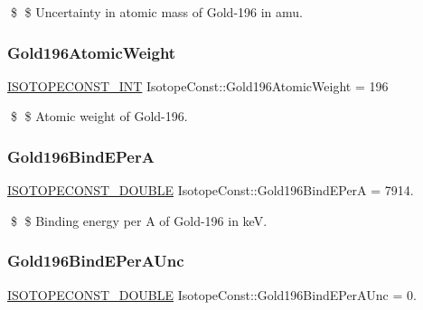\$ \$ Uncertainty in atomic mass of Gold-\/196 in amu. \mbox{\label{group___isotope_const-_gold-_au196_ga96871e34b914e66d1fdf90c41ed42cc0}} 
\subsubsection{\texorpdfstring{Gold196\+Atomic\+Weight}{Gold196AtomicWeight}}
{\footnotesize\ttfamily \mbox{\hyperlink{group___isotope_const-_macros_ga5f18360b3e99483a35c32d789e62621c}{I\+S\+O\+T\+O\+P\+E\+C\+O\+N\+S\+T\+\_\+\+I\+NT}} Isotope\+Const\+::\+Gold196\+Atomic\+Weight = 196}

\$ \$ Atomic weight of Gold-\/196. \mbox{\label{group___isotope_const-_gold-_au196_ga0e1453d692703267c5e45c6b6186fea3}} 
\subsubsection{\texorpdfstring{Gold196\+Bind\+E\+PerA}{Gold196BindEPerA}}
{\footnotesize\ttfamily \mbox{\hyperlink{group___isotope_const-_macros_ga8f45a7272ce02c0b4c65c44636ed719a}{I\+S\+O\+T\+O\+P\+E\+C\+O\+N\+S\+T\+\_\+\+D\+O\+U\+B\+LE}} Isotope\+Const\+::\+Gold196\+Bind\+E\+PerA = 7914.}

\$ \$ Binding energy per A of Gold-\/196 in keV. \mbox{\label{group___isotope_const-_gold-_au196_ga9f957932e374ef4dd2f2a382c90026ba}} 
\subsubsection{\texorpdfstring{Gold196\+Bind\+E\+Per\+A\+Unc}{Gold196BindEPerAUnc}}
{\footnotesize\ttfamily \mbox{\hyperlink{group___isotope_const-_macros_ga8f45a7272ce02c0b4c65c44636ed719a}{I\+S\+O\+T\+O\+P\+E\+C\+O\+N\+S\+T\+\_\+\+D\+O\+U\+B\+LE}} Isotope\+Const\+::\+Gold196\+Bind\+E\+Per\+A\+Unc = 0.}

